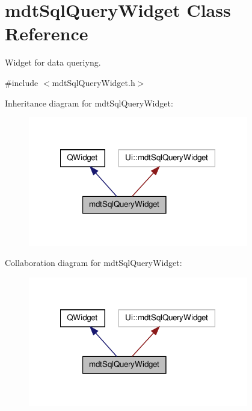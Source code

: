 \hypertarget{classmdt_sql_query_widget}{\section{mdt\-Sql\-Query\-Widget Class Reference}
\label{classmdt_sql_query_widget}
}


Widget for data queriyng.  




{\ttfamily \#include $<$mdt\-Sql\-Query\-Widget.\-h$>$}



Inheritance diagram for mdt\-Sql\-Query\-Widget\-:\nopagebreak
\begin{figure}[H]
\begin{center}
\leavevmode
\includegraphics[width=272pt]{classmdt_sql_query_widget__inherit__graph}
\end{center}
\end{figure}


Collaboration diagram for mdt\-Sql\-Query\-Widget\-:\nopagebreak
\begin{figure}[H]
\begin{center}
\leavevmode
\includegraphics[width=272pt]{classmdt_sql_query_widget__coll__graph}
\end{center}
\end{figure}
